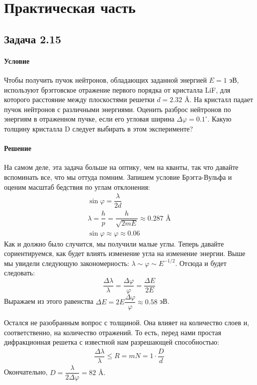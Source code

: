 \documentclass[12pt]{article}
\begin{document}
\section{Практическая часть}

\subsection{Задача 2.15}
\label{task_2.15}
\paragraph{Условие}
Чтобы получить пучок нейтронов, обладающих заданной энергией $E = 1$ эВ, используют брэгговское отражение первого порядка от кристалла LiF, для которого расстояние между плоскостями решетки $d = 2.32$ \AA . На кристалл падает пучок нейтронов с различными энергиями. Оценить разброс нейтронов по энергиям в отраженном пучке, если его угловая ширина $\Delta \varphi = 0.1^{\circ}$. Какую толщину кристалла D следует выбирать в этом эксперименте?
\paragraph{Решение}
На самом деле, эта задача больше на оптику, чем на кванты, так что давайте вспоминать все, что мы оттуда помним. Запишем условие Брэгга-Вульфа и оценим масштаб бедствия по углам отклонения:
\begin{gather*}
    \sin{\varphi} = \dfrac{\lambda}{2d}\\
    \lambda = \dfrac{h}{p} = \dfrac{h}{\sqrt{2mE}} \approx 0.287 \text{ \AA} \\
    \sin{\varphi} \approx \varphi \approx 0.06
\end{gather*}
Как и должно было случится, мы получили малые углы. Теперь давайте сориентируемся, как будет влиять изменение угла на изменение энергии. Выше мы увидели следующую закономерность: $\lambda \sim \varphi  \sim E^{-1/2} $. Отсюда и будет следовать:
\begin{equation*}
    \dfrac{\Delta \lambda}{\lambda} = \dfrac{\Delta \varphi}{\varphi} = \dfrac{\Delta E}{2E}
\end{equation*}
Выражаем из этого равенства $\Delta E = 2E \dfrac{\Delta \varphi}{\varphi} \approx 0.58$ эВ.

\vspace{1em} \noindent
Остался не разобранным вопрос с толщиной. Она влияет на количество слоев и, соответственно, на количество отражений. То есть, перед нами простая дифракционная решетка с известной нам разрешающей способностью:
\begin{gather*}
    \dfrac{\Delta \lambda}{\lambda} \le R = mN = 1\cdot \dfrac{D}{d}
\end{gather*}
Окончательно, $D = \dfrac{\lambda}{2\Delta \varphi} = 82 \text{ \AA}.$
\end{document}
